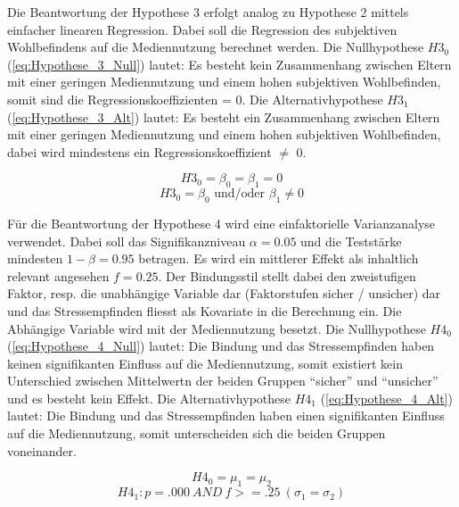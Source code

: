 Die Beantwortung der Hypothese 3 erfolgt analog zu Hypothese 2 mittels einfacher linearen Regression. Dabei soll die Regression des subjektiven Wohlbefindens auf die Mediennutzung berechnet werden. Die Nullhypothese $H3_{0}$ (\ref{eq:Hypothese_3_Null}) lautet: Es besteht kein Zusammenhang zwischen Eltern mit einer geringen Mediennutzung und einem hohen subjektiven Wohlbefinden, somit sind die Regressionskoeffizienten = 0. Die Alternativhypothese $H3_{1}$ (\ref{eq:Hypothese_3_Alt}) lautet: Es besteht ein Zusammenhang zwischen Eltern mit einer geringen Mediennutzung und einem hohen subjektiven Wohlbefinden, dabei wird mindestens ein Regressionskoeffizient $\neq$ 0.

\begin{equation}\label{eq:Hypothese_3_Null}
    H3_{0}=\beta_0 = \beta_1 = 0
\end{equation}
\begin{equation}\label{eq:Hypothese_3_Alt}
    H3_{0}=\beta_0 \text{ und/oder } \beta_1 \neq 0
\end{equation}

Für die Beantwortung der Hypothese 4 wird eine einfaktorielle Varianzanalyse verwendet. Dabei soll das Signifikanzniveau $\alpha=0.05$ und die Teststärke mindesten $1-\beta=0.95$ betragen. Es wird ein mittlerer Effekt \cite{Cohen1988a} als inhaltlich relevant angesehen $f = 0.25$. Der Bindungsstil stellt dabei den zweistufigen Faktor, resp. die unabhängige Variable dar (Faktorstufen sicher / unsicher) dar und das Stressempfinden fliesst als Kovariate in die Berechnung ein. Die Abhängige Variable wird mit der Mediennutzung besetzt. Die Nullhypothese $H4_{0}$ (\ref{eq:Hypothese_4_Null}) lautet: Die Bindung und das Stressempfinden haben keinen signifikanten Einfluss auf die Mediennutzung, somit existiert kein Unterschied zwischen Mittelwertn der beiden Gruppen \enquote{sicher} und \enquote{unsicher} und es besteht kein Effekt. Die Alternativhypothese $H4_{1}$ (\ref{eq:Hypothese_4_Alt}) lautet: Die Bindung und das Stressempfinden haben einen signifikanten Einfluss auf die Mediennutzung, somit unterscheiden sich die beiden Gruppen voneinander.

\begin{equation}\label{eq:Hypothese_4_Null}
    H4_{0} = \mu_1 = \mu_2
\end{equation}
\begin{equation}\label{eq:Hypothese_4_Alt}
    H4_{1}:p=.000 ~ AND ~ f>=.25~ (\sigma_1 = \sigma_2)
\end{equation}